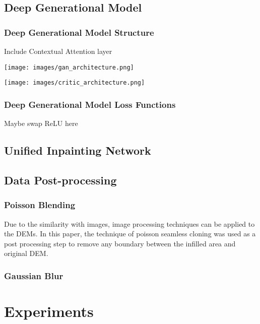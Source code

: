 \documentclass[twocolumn]{article}
\begin{document}
\subsection{Deep Generational Model}
\label{sec:orgf2c7fd6}
\subsubsection{Deep Generational Model Structure}
\label{sec:org0fde61b}
Include Contextual Attention layer

\begin{figure*}
\centering
\texttt{[image: images/gan\_architecture.png]}
\end{figure*}

\begin{figure*}
\centering
\texttt{[image: images/critic\_architecture.png]}
\end{figure*}

\subsubsection{Deep Generational Model Loss Functions}
\label{sec:org9843b60}
Maybe swap ReLU here
\subsection{Unified Inpainting Network}
\label{sec:org0889ae7}
\subsection{Data Post-processing}
\label{sec:orgd1e9f4f}
\subsubsection{Poisson Blending}
\label{sec:org745c6de}
Due to the similarity with images, image processing techniques can be applied to the DEMs.
In this paper, the technique of poisson seamless cloning\autocite{perezPoissonImageEditing2003} was used as a post processing step to remove any boundary between the infilled area and original DEM.

\subsubsection{Gaussian Blur}
\label{sec:org9921cbc}


\section{Experiments}
\label{sec:org9be985b}
\end{document}
